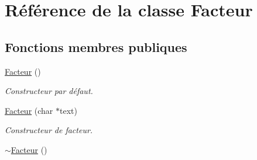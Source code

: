\hypertarget{classFacteur}{
\section{Référence de la classe Facteur}
\label{classFacteur}
}
\subsection*{Fonctions membres publiques}
\begin{DoxyCompactItemize}
\item 
\hypertarget{classFacteur_a989e3e6f53f97d5adfd2e7e3fc1f4cf1}{
\hyperlink{classFacteur_a989e3e6f53f97d5adfd2e7e3fc1f4cf1}{Facteur} ()}
\label{classFacteur_a989e3e6f53f97d5adfd2e7e3fc1f4cf1}

\begin{DoxyCompactList}\small\item\em Constructeur par défaut. \item\end{DoxyCompactList}\item 
\hyperlink{classFacteur_af0d4423b4ebe026d9dbe8ef06eb23d9f}{Facteur} (char $\ast$text)
\begin{DoxyCompactList}\small\item\em Constructeur de facteur. \item\end{DoxyCompactList}\item 
\hypertarget{classFacteur_a71486fcb174b3a49520bf1e60fbf8e69}{
\hyperlink{classFacteur_a71486fcb174b3a49520bf1e60fbf8e69}{$\sim$Facteur} ()}
\label{classFacteur_a71486fcb174b3a49520bf1e60fbf8e69}


\end{DoxyCompactItemize}
